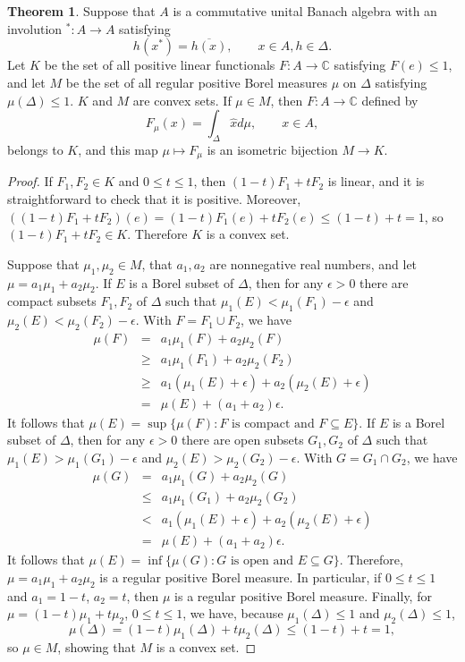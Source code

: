\documentclass{article}
\theoremstyle{definition}
\newtheorem{theorem}{Theorem}
\theoremstyle{definition}
\begin{document}
\begin{theorem}
Suppose that $A$ is a commutative unital Banach algebra with an involution $^*:A \to A$ satisfying 
\begin{equation}
h(x^*)=\overline{h(x)}, \qquad x \in A, h \in \Delta.
\label{symmetric}
\end{equation}
Let $K$ be the set of all positive linear functionals $F:A \to \mathbb{C}$ satisfying $F(e) \leq 1$, and let
$M$ be the set of all regular positive  Borel measures $\mu$ on $\Delta$ satisfying $\mu(\Delta) \leq 1$. 
$K$ and $M$ are convex sets.
If $\mu \in M$, then $F:A \to \mathbb{C}$ defined by
\[
F_\mu(x) = \int_\Delta \hat{x} d\mu, \qquad x \in A,
\]
belongs to $K$, and this map $\mu \mapsto F_\mu$ is an isometric bijection $M \to K$.
\label{bijection}
\end{theorem}
\begin{proof}
If $F_1,F_2 \in K$ and $0 \leq t \leq 1$, then $(1-t)F_1+tF_2$ is linear, and it is straightforward to check that it is positive. Moreover,
$((1-t)F_1+tF_2)(e) = (1-t)F_1(e)+tF_2(e) \leq (1-t)+t =1$, so $(1-t)F_1+tF_2 \in K$. Therefore $K$ is a convex set. 

Suppose that $\mu_1,\mu_2 \in M$, that $a_1,a_2$ are nonnegative real numbers, and let $\mu=a_1\mu_1+a_2\mu_2$.
If $E$ is a Borel subset of $\Delta$, then for any $\epsilon>0$ 
there are compact
subsets $F_1,F_2$ of $\Delta$ such that $\mu_1(E) < \mu_1(F_1)-\epsilon$ and $\mu_2(E)<\mu_2(F_2)-\epsilon$.
With $F=F_1 \cup F_2$, we have
\begin{eqnarray*}
\mu(F) &=&a_1\mu_1(F)+a_2\mu_2(F)\\
&\geq&a_1\mu_1(F_1)+a_2\mu_2(F_2)\\
&\geq&a_1(\mu_1(E)+\epsilon)+a_2(\mu_2(E)+\epsilon)\\
&=&\mu(E)+(a_1+a_2)\epsilon.
\end{eqnarray*}
It follows that $\mu(E) = \sup\{\mu(F): \textrm{$F$ is compact and $F \subseteq E$}\}$. If $E$ is a Borel subset of $\Delta$, then for any $\epsilon>0$ there
are open subsets $G_1,G_2$ of $\Delta$ such that $\mu_1(E)>\mu_1(G_1)-\epsilon$ and $\mu_2(E)>\mu_2(G_2)-\epsilon$.
With $G=G_1 \cap G_2$, we have
\begin{eqnarray*}
\mu(G)&=&a_1\mu_1(G)+a_2\mu_2(G)\\
&\leq&a_1\mu_1(G_1)+a_2\mu_2(G_2)\\
&<&a_1(\mu_1(E)+\epsilon)+a_2(\mu_2(E)+\epsilon)\\
&=&\mu(E)+(a_1+a_2)\epsilon.
\end{eqnarray*}
It follows that $\mu(E)=\inf\{\mu(G): \textrm{$G$ is open and $E \subseteq G$}\}$. 
Therefore, $\mu=a_1\mu_1+a_2\mu_2$ is a regular positive Borel
measure. In particular, if $0 \leq t \leq 1$ and $a_1=1-t$, $a_2=t$, then $\mu$ is a regular positive Borel measure.
Finally, for $\mu=(1-t)\mu_1+t\mu_2$, $0 \leq t \leq 1$, we have, because $\mu_1(\Delta) \leq 1$ and $\mu_2(\Delta) \leq 1$, 
\[
\mu(\Delta) = (1-t)\mu_1(\Delta)+t\mu_2(\Delta) \leq (1-t) +t =1,
\]
so $\mu \in M$, showing that $M$ is a convex set.



\end{proof}
\end{document}
